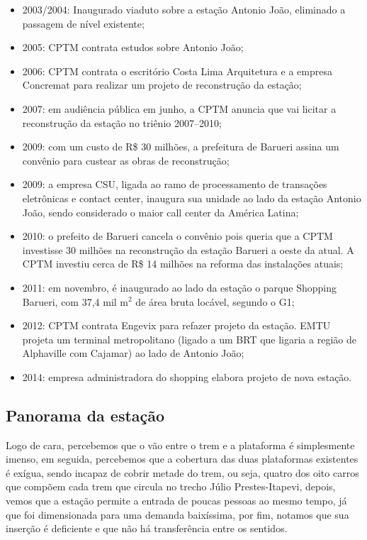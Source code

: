 \documentclass[11pt,fleqn]{book} %
\begin{document}
\begin{itemize}
	\item 2003/2004: Inaugurado viaduto sobre a estação Antonio João, eliminado a passagem de nível existente;
	\item 2005: CPTM contrata estudos sobre Antonio João;
	\item 2006: CPTM contrata o escritório Costa Lima Arquitetura e a empresa Concremat para realizar um projeto de reconstrução da estação;
	\item 2007: em audiência pública em junho, a CPTM anuncia que vai licitar a reconstrução da estação no triênio 2007–2010;
	\item 2009: com um custo de R\$ 30 milhões, a prefeitura de Barueri assina um convênio para custear as obras de reconstrução;
	\item 2009: a empresa CSU, ligada ao ramo de processamento de transações eletrônicas e contact center, inaugura sua unidade ao lado da estação Antonio João, sendo considerado o maior call center da América Latina;
	\item 2010: o prefeito de Barueri cancela o convênio pois queria que a CPTM investisse 30 milhões na reconstrução da estação Barueri a oeste da atual. A CPTM investiu cerca de R\$ 14 milhões na reforma das instalações atuais;
	\item 2011: em novembro, é inaugurado ao lado da estação o parque Shopping Barueri, com 37,4 mil m$^{2}$ de área bruta locável, segundo o G1;
	\item 2012: CPTM contrata Engevix para refazer projeto da estação. EMTU projeta um terminal metropolitano (ligado a um BRT que ligaria a região de Alphaville com Cajamar) ao lado de Antonio João;
	\item 2014: empresa administradora do shopping elabora projeto de nova estação.
\end{itemize}

\subsection{Panorama da estação}

Logo de cara, percebemos que o vão entre o trem e a plataforma é simplesmente imenso, em seguida, percebemos que a cobertura das duas plataformas existentes é exígua, sendo incapaz de cobrir metade do trem, ou seja, quatro dos oito carros que compõem cada trem que circula no trecho Júlio Prestes-Itapevi, depois, vemos que a estação permite a entrada de poucas pessoas ao mesmo tempo, já que foi dimensionada para uma demanda baixíssima, por fim, notamos que sua inserção é deficiente e que não há transferência entre os sentidos.
\end{document}
